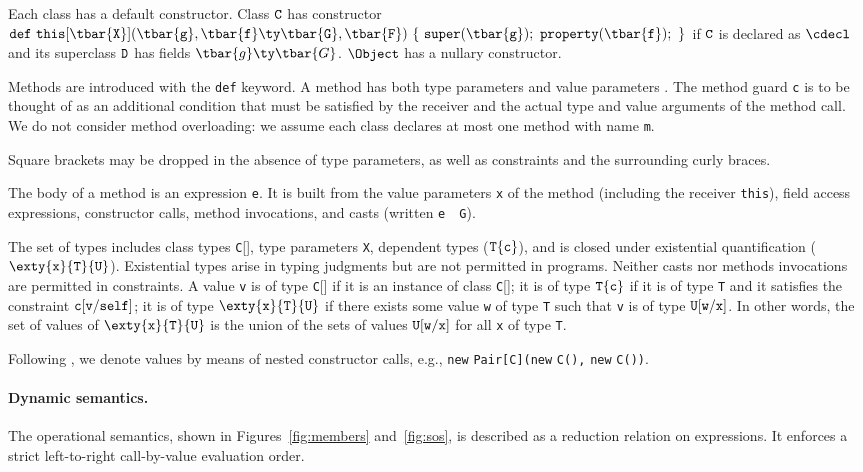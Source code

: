 Each class has a default constructor. Class $\tt C$ has constructor
$\tt def~this[\tbar{X}](\tbar{g},\tbar{f}\ty\tbar{G},\tbar{F})~\{~super(\tbar{g});~property(\tbar{f});~\}$ if $\tt C$ is declared as
$\cdecl$ and its superclass $\tt D$ has fields $\tbar{g}\ty\tbar{G}$. $\Object$ has a nullary constructor.

Methods are introduced with the {\tt def} keyword. A method has both type parameters {} and value parameters {}. The method guard {\tt c} is to be thought of as an additional condition that must be satisfied by the receiver and the actual type and value arguments of the method call. We do not consider method overloading: we assume each class declares at most one method with name {\tt m}.

Square brackets may be dropped in the absence of type parameters, as well as \true{} constraints and the surrounding curly braces.

The body of a method is an expression {\tt e}. It is built from the value parameters {\tt x} of the method (including the receiver {\tt this}), field access expressions, constructor calls, method invocations, and casts (written {\tt e}~\as~{\tt G}).

The set of types includes class types {\tt C}[], type parameters {\tt X}, dependent types ($\tt T\{c\}$), and is closed under existential quantification ($\exty{\tt x}{\tt T}{\tt U}$). Existential types arise in typing judgments but are not permitted in programs. Neither casts nor methods invocations are permitted in constraints. A value {\tt v} is of type {\tt C}[] if it is an instance of class {\tt C}[]; it is of type $\tt T\{c\}$ if it is of type {\tt T} and it satisfies the constraint $\tt c[v/self]$; it is of type $\exty{\tt x}{\tt T}{\tt U}$ if there exists some value {\tt w} of type {\tt T} such that {\tt v} is of type $\tt U[w/x]$. In other words, the set of values of $\exty{\tt x}{\tt T}{\tt U}$ is the union of the sets of values $\tt U[w/x]$ for all {\tt x} of type {\tt T}.

Following \FJ{}, we denote values by means of nested constructor calls, e.g.,
\texttt{new} \texttt{Pair[C](new} \texttt{C(),} \texttt{new} \texttt{C())}.

\paragraph{Dynamic semantics.}
The operational semantics, shown in Figures~\ref{fig:members} and~\ref{fig:sos}, is described as a reduction relation on expressions. It enforces a strict left-to-right call-by-value evaluation order.

